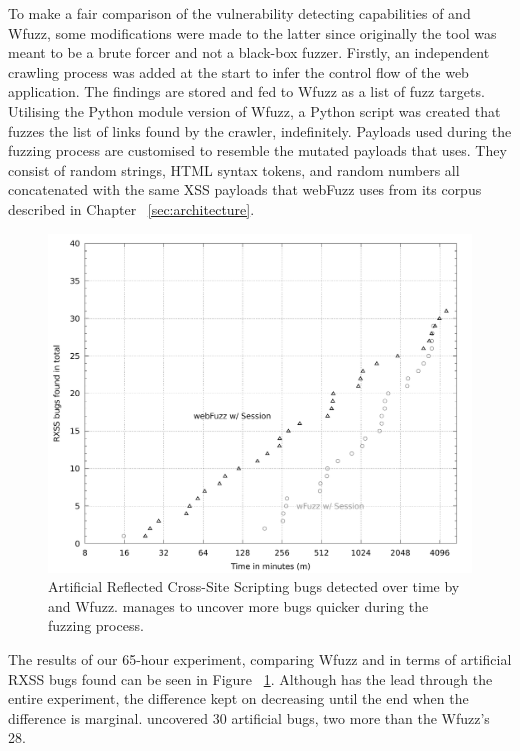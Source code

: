 To make a fair comparison of the vulnerability detecting capabilities of \pname{} and Wfuzz, some modifications were made to the latter since originally the tool was meant to be a brute forcer and not a black-box fuzzer. Firstly, an independent crawling process was added at the start to infer the control flow of the web application. The findings are stored and fed to Wfuzz as a list of fuzz targets. Utilising the Python module version of Wfuzz, a Python script was created that fuzzes the list of links found by the crawler, indefinitely. Payloads used during the fuzzing process are customised to resemble the mutated payloads that \pname{} uses. They consist of random strings, HTML syntax tokens, and random numbers all concatenated with the same XSS payloads that webFuzz uses from its corpus described in Chapter ~\ref{sec:architecture}.

\begin{figure}[!htb]
  \centering \includegraphics[width=\linewidth]{figures/plot_bugs.pdf}
  \caption{ Artificial Reflected Cross-Site Scripting bugs detected over time by \pname{} and Wfuzz. \pname{} manages to uncover more bugs quicker during the fuzzing process.} 
  \label{fig:plot_rxss}
\end{figure}

The results of our 65-hour experiment, comparing Wfuzz and \pname{} in terms of artificial RXSS bugs found can be seen in Figure ~\ref{fig:plot_rxss}. Although \pname{} has the lead through the entire experiment, the difference kept on decreasing until the end when the difference is marginal. \pname{} uncovered 30 artificial bugs, two more than the Wfuzz's 28.

